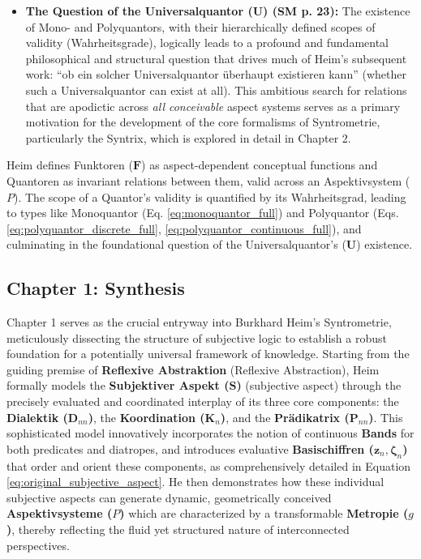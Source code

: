 \documentclass[12pt]{article}
\newcommand{\q}[1]{\enquote{#1}}
\newcommand{\universalquantor}{\bm{U}}
\newcommand{\aspektivsystem}{P}
\newcommand{\funktor}{\bm{F}}
\begin{document}
\begin{itemize}
    \item \textbf{The Question of the Universalquantor (\(\universalquantor\)) (SM p. 23):}
    The existence of Mono- and Polyquantors, with their hierarchically defined scopes of validity (Wahrheitsgrade), logically leads to a profound and fundamental philosophical and structural question that drives much of Heim's subsequent work: \q{ob ein solcher Universalquantor überhaupt existieren kann} (whether such a Universalquantor can exist at all). This ambitious search for relations that are apodictic across \textit{all conceivable} aspect systems serves as a primary motivation for the development of the core formalisms of Syntrometrie, particularly the Syntrix, which is explored in detail in Chapter 2.
\end{itemize}

Heim defines Funktoren (\(\funktor\)) as aspect-dependent conceptual functions and Quantoren as invariant relations between them, valid across an Aspektivsystem (\(\aspektivsystem\)). The scope of a Quantor's validity is quantified by its Wahrheitsgrad, leading to types like Monoquantor (Eq. \eqref{eq:monoquantor_full}) and Polyquantor (Eqs. \eqref{eq:polyquantor_discrete_full}, \eqref{eq:polyquantor_continuous_full}), and culminating in the foundational question of the Universalquantor's (\(\universalquantor\)) existence.

\subsection{Chapter 1: Synthesis}
\label{sec:chapter1_synthesis}

Chapter 1 serves as the crucial entryway into Burkhard Heim's Syntrometrie, meticulously dissecting the structure of subjective logic to establish a robust foundation for a potentially universal framework of knowledge. Starting from the guiding premise of \textbf{Reflexive Abstraktion} (Reflexive Abstraction), Heim formally models the \textbf{Subjektiver Aspekt (\(\mathbf{S}\))} (subjective aspect) through the precisely evaluated and coordinated interplay of its three core components: the \textbf{Dialektik (\(\mathbf{D}_{nn}\))}, the \textbf{Koordination (\(\mathbf{K}_n\))}, and the \textbf{Prädikatrix (\(\mathbf{P}_{nn}\))}. This sophisticated model innovatively incorporates the notion of continuous \textbf{Bands} for both predicates and diatropes, and introduces evaluative \textbf{Basischiffren (\(\mathbf{z}_n, \bm{\zeta}_n\))} that order and orient these components, as comprehensively detailed in Equation \eqref{eq:original_subjective_aspect}. He then demonstrates how these individual subjective aspects can generate dynamic, geometrically conceived \textbf{Aspektivsysteme (\(\aspektivsystem\))} which are characterized by a transformable \textbf{Metropie (\(g\))}, thereby reflecting the fluid yet structured nature of interconnected perspectives.
\end{document}
